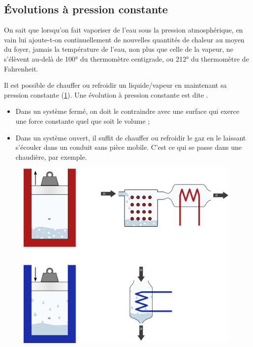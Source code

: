 	\subsection{Évolutions à pression constante}
	\label{ch_lv_isobare}

	On sait que lorsqu’on fait vaporiser de l’eau sous la pression atmosphérique, en vain lui ajoute-t-on continuellement de nouvelles quantités de chaleur au moyen du foyer, jamais la température de l’eau, non plus que celle de la vapeur, ne s’élèvent au-delà de 100° du thermomètre centigrade, ou 212° du thermomètre de Fahrenheit.

	Il est possible de chauffer ou refroidir un liquide/vapeur en maintenant sa pression constante (\cref{fig_lv_pression_constante}). Une évolution à pression constante est dite .
		
		\begin{itemize}
			\item Dans un système fermé, on doit le contraindre avec une surface qui exerce une force constante quel que soit le volume ;
			\item Dans un système ouvert, il suffit de chauffer ou refroidir le gaz en le laissant s’écouler dans un conduit sans pièce mobile. C’est ce qui se passe dans une chaudière, par exemple.
		\end{itemize}

		\begin{figure}
			\begin{center}
				\includegraphics[width=11cm]{images/lv_isobare.png}
			\end{center}
			\label{fig_lv_pression_constante}
		\end{figure}
		
